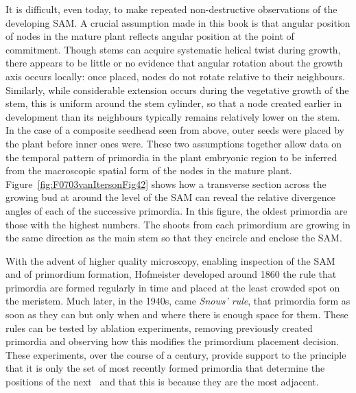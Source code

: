 It is difficult, even today, to make repeated non-destructive observations of the developing SAM. A crucial assumption made in this book is that angular position of nodes in the mature plant reflects angular position at the point of commitment. Though stems can acquire systematic helical twist during growth, there appears to be little or no evidence that angular rotation about the growth axis occurs locally: once placed,  nodes do not rotate relative to their neighbours. Similarly, while considerable  extension occurs during the vegetative growth of the stem, this is uniform around the stem cylinder, so that a node created earlier in development than its neighbours typically remains relatively lower on the stem.  In the case of a composite seedhead seen from above, outer seeds were placed by the plant before inner ones were. 
These two assumptions together allow data on the temporal pattern of primordia in the plant embryonic region to be inferred from the macroscopic spatial form of the nodes in the mature plant.
Figure~\ref{fig:F0703vanItersonFig42} shows how a transverse section across the growing bud at around the level of the SAM can reveal the relative divergence angles of each of the successive primordia. In this figure, the oldest primordia are those with the highest numbers. The shoots from each primordium are growing in the same direction as the main stem so that they encircle and enclose the SAM. 
 
With the advent of higher quality microscopy, enabling inspection of the SAM and of primordium formation,  Hofmeister developed around 1860 the rule  that primordia are formed regularly in time and placed at the least crowded spot on the meristem. Much later, in the 1940s, came \emph{Snows' rule}, that primordia form as soon as they can but only when and where there is enough space for them.%
 These rules can be tested by ablation experiments, removing previously created primordia and observing how this modifies the primordium placement decision. These experiments, over the course of a century, provide support to the principle that it is only the set of most recently formed primordia that determine the positions of the next~\autocite{snowExperimentsPhyllotaxisII1933,reinhardtRegulationPhyllotaxisPolar2003} and that this is because they are the most adjacent. 
 
